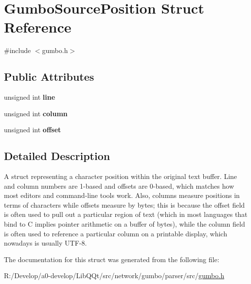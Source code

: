 \hypertarget{struct_gumbo_source_position}{}\section{Gumbo\+Source\+Position Struct Reference}
\label{struct_gumbo_source_position}


{\ttfamily \#include $<$gumbo.\+h$>$}

\subsection*{Public Attributes}
\begin{DoxyCompactItemize}
\item 
\mbox{\label{struct_gumbo_source_position_a16cbbccf23f85b612f3e415ce31f187b}} 
unsigned int {\bfseries line}
\item 
\mbox{\label{struct_gumbo_source_position_afb22c9bde5b0510161cca816e7489df2}} 
unsigned int {\bfseries column}
\item 
\mbox{\label{struct_gumbo_source_position_ab9d9a2d8d9482ecd61fa1b9dd7fef417}} 
unsigned int {\bfseries offset}
\end{DoxyCompactItemize}


\subsection{Detailed Description}
A struct representing a character position within the original text buffer. Line and column numbers are 1-\/based and offsets are 0-\/based, which matches how most editors and command-\/line tools work. Also, columns measure positions in terms of characters while offsets measure by bytes; this is because the offset field is often used to pull out a particular region of text (which in most languages that bind to C implies pointer arithmetic on a buffer of bytes), while the column field is often used to reference a particular column on a printable display, which nowadays is usually U\+T\+F-\/8. 

The documentation for this struct was generated from the following file\+:\begin{DoxyCompactItemize}
\item 
R\+:/\+Develop/a0-\/develop/\+Lib\+Q\+Qt/src/network/gumbo/parser/src/\mbox{\hyperlink{gumbo_8h}{gumbo.\+h}}\end{DoxyCompactItemize}
